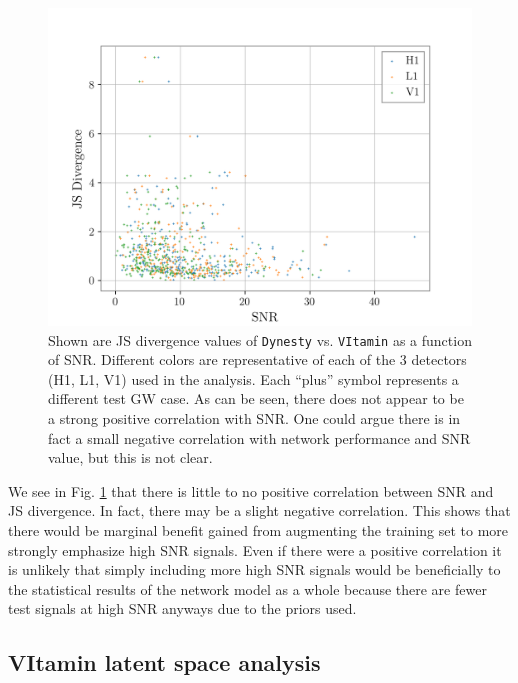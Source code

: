 \begin{figure}
    \includegraphics[width=\columnwidth]{figures/JS_vs_SNR_nature_paper.png}
    \caption[JS divergences of \texttt{Dynesty} vs. \texttt{VItamin} as a function of \ac{SNR}.]{\label{fig:JS_vs_SNR_dynesty} Shown are JS divergence values of \texttt{Dynesty} vs. \texttt{VItamin} as a function of \ac{SNR}. Different colors are representative of each of the 3 detectors (H1, L1, V1) used in the analysis. Each ``plus'' symbol represents a different test \ac{GW} case. As can be seen, there does not appear to be a strong positive correlation with \ac{SNR}. One could argue there is in fact a small negative correlation with network performance and \ac{SNR} value, but this is not clear. }
\end{figure}

We see in Fig. \ref{fig:JS_vs_SNR_dynesty} that there is little to no 
positive correlation between \ac{SNR} and JS divergence. In fact, there 
may be a slight negative correlation. This shows that there would be 
marginal benefit gained from augmenting the training set to more strongly 
emphasize high \ac{SNR} signals. Even if there were a positive correlation 
it is unlikely that simply including more high \ac{SNR} signals would be 
beneficially to the statistical results of the network model as a 
whole because there are fewer test signals at high \ac{SNR} anyways due 
to the priors used.

\subsection{VItamin latent space analysis}

